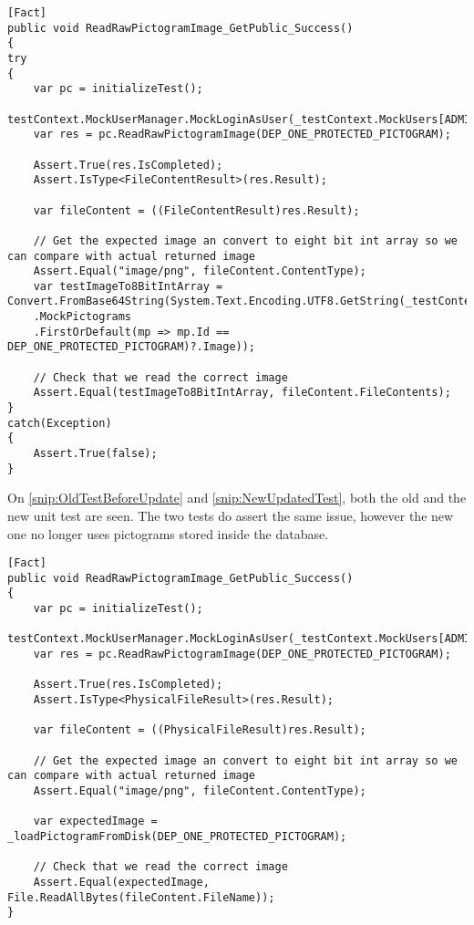 \begin{lstlisting}[label={snip:OldTestBeforeUpdate}, caption={The old test after images are served from disk}, captionpos=b, language=CSharp] 
[Fact]
public void ReadRawPictogramImage_GetPublic_Success()
{
try
{
    var pc = initializeTest();
    testContext.MockUserManager.MockLoginAsUser(_testContext.MockUsers[ADMIN_DEP_ONE]);
    var res = pc.ReadRawPictogramImage(DEP_ONE_PROTECTED_PICTOGRAM);

    Assert.True(res.IsCompleted);
    Assert.IsType<FileContentResult>(res.Result);

    var fileContent = ((FileContentResult)res.Result);

    // Get the expected image an convert to eight bit int array so we can compare with actual returned image
    Assert.Equal("image/png", fileContent.ContentType);
    var testImageTo8BitIntArray = Convert.FromBase64String(System.Text.Encoding.UTF8.GetString(_testContext
    .MockPictograms
    .FirstOrDefault(mp => mp.Id == DEP_ONE_PROTECTED_PICTOGRAM)?.Image));

    // Check that we read the correct image
    Assert.Equal(testImageTo8BitIntArray, fileContent.FileContents);
}
catch(Exception)
{
    Assert.True(false);
}
\end{lstlisting}

On \autoref{snip:OldTestBeforeUpdate} and \autoref{snip:NewUpdatedTest}, both the old and the new unit test are seen. 
The two tests do assert the same issue, however the new one no longer uses pictograms stored inside the database.

\begin{lstlisting}[label={snip:NewUpdatedTest}, caption={The updated test after images are served from disk)}, captionpos=b, language=CSharp] 
[Fact]
public void ReadRawPictogramImage_GetPublic_Success()
{
    var pc = initializeTest();
    testContext.MockUserManager.MockLoginAsUser(_testContext.MockUsers[ADMIN_DEP_ONE]);
    var res = pc.ReadRawPictogramImage(DEP_ONE_PROTECTED_PICTOGRAM);

    Assert.True(res.IsCompleted);
    Assert.IsType<PhysicalFileResult>(res.Result);

    var fileContent = ((PhysicalFileResult)res.Result);

    // Get the expected image an convert to eight bit int array so we can compare with actual returned image
    Assert.Equal("image/png", fileContent.ContentType);
            
    var expectedImage = _loadPictogramFromDisk(DEP_ONE_PROTECTED_PICTOGRAM);

    // Check that we read the correct image
    Assert.Equal(expectedImage, File.ReadAllBytes(fileContent.FileName));      
}
\end{lstlisting}

